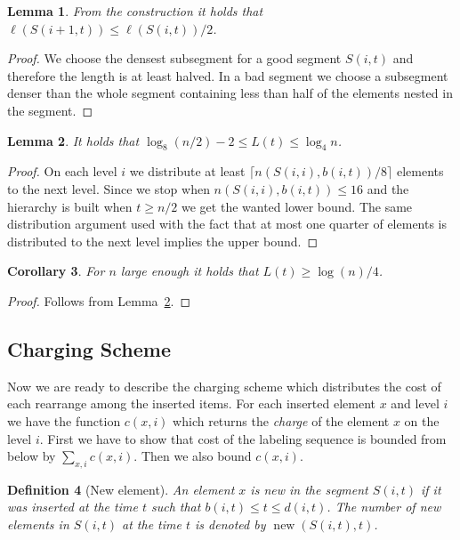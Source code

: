 \documentclass[11pt]{article} %
\newcommand{\length}[1]{\ell(#1)}
\newcommand{\charge}[2]{c(#1, #2)}
\newcommand{\new}[2]{\operatorname{new}(#1, #2)}
\newcommand{\scount}[2]{n(#1, #2)}
\newcommand{\segment}[2]{S(#1, #2)}
\newtheorem{definition}{Definition} %
\newtheorem{lemma}[definition]{Lemma}
\newtheorem{corollary}[definition]{Corollary}
\begin{document}
\begin{lemma}
From the construction it holds that $\length{\segment{i + 1}{t}} \leq \length{\segment{i}{t}}/2$.
\end{lemma}
\begin{proof}
We choose the densest subsegment for a good segment $\segment{i}{t}$ and therefore the length is at least halved.
In a bad segment we choose a subsegment denser than the whole segment containing less than half of the elements nested in the segment.
\end{proof}

\begin{lemma}
\label{lm:L-bounds}
It holds that $\log_8 (n/2) - 2 \leq L(t) \leq \log_4 n$.
\end{lemma}
\begin{proof}
On each level $i$ we distribute at least $\lceil \scount{\segment{i}{i}}{b(i, t)}/8 \rceil$ elements to the next level.
Since we stop when $\scount{\segment{i}{i}}{b(i, t)} \leq 16$ and the hierarchy is built when $t \geq n/2$ we get the wanted lower bound.
The same distribution argument used with the fact that at most one quarter of elements is distributed to the next level implies the upper bound.
\end{proof}

\begin{corollary}
\label{cor:L-bound}
For $n$ large enough it holds that $L(t) \geq \log(n) / 4$.
\end{corollary}
\begin{proof}
Follows from Lemma~\ref{lm:L-bounds}.
\end{proof}

\subsection{Charging Scheme} 
Now we are ready to describe the charging scheme which distributes the cost of each rearrange among the inserted items.
For each inserted element $x$ and level $i$ we have the function $\charge{x}{i}$ which returns the \emph{charge} of the element $x$ on the level $i$.
First we have to show that cost of the labeling sequence is bounded from below by $\sum_{x, i} \charge{x}{i}$.
Then we also bound $\charge{x}{i}$.

\begin{definition}[New element]
An element $x$ is \emph{new} in the segment $\segment{i}{t}$ if it was inserted at the time $t$ such that $b(i, t) \leq t \leq d(i, t)$.
The number of new elements in $\segment{i}{t}$ at the time $t$ is denoted by $\new{\segment{i}{t}}{t}$.
\end{definition}
\end{document}
